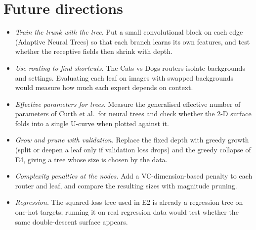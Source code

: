 \section{Future directions}
\begin{itemize}
\item \emph{Train the trunk with the tree.} Put a small convolutional block on each edge (Adaptive Neural Trees) so that each branch learns its own features, and test whether the receptive fields then shrink with depth.
\item \emph{Use routing to find shortcuts.} The Cats vs Dogs routers isolate backgrounds and settings. Evaluating each leaf on images with swapped backgrounds would measure how much each expert depends on context.
\item \emph{Effective parameters for trees.} Measure the generalised effective number of parameters of Curth et al.\ for neural trees and check whether the 2-D surface folds into a single U-curve when plotted against it.
\item \emph{Grow and prune with validation.} Replace the fixed depth with greedy growth (split or deepen a leaf only if validation loss drops) and the greedy collapse of E4, giving a tree whose size is chosen by the data.
\item \emph{Complexity penalties at the nodes.} Add a VC-dimension-based penalty \cite{jayadeva2017} to each router and leaf, and compare the resulting sizes with magnitude pruning.
\item \emph{Regression.} The squared-loss tree used in E2 is already a regression tree on one-hot targets; running it on real regression data would test whether the same double-descent surface appears.
\end{itemize}

